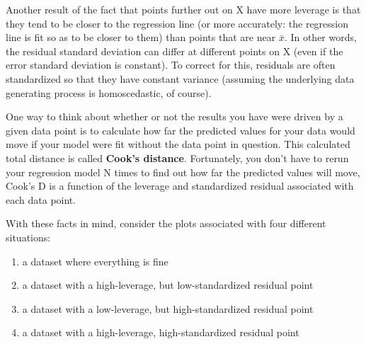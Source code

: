 \documentclass[12pt, a4paper]{article}
\theoremstyle{plain}
\theoremstyle{definition}
\theoremstyle{remark}
\begin{document}
Another result of the fact that points further out on X have more leverage is that they tend to be closer to the regression line (or more accurately: the regression line is fit so as to be closer to them) than points that are near $\bar{x}$. In other words, the residual standard deviation can differ at different points on X (even if the error standard deviation is constant). To correct for this, residuals are often standardized so that they have constant variance (assuming the underlying data generating process is homoscedastic, of course).

One way to think about whether or not the results you have were driven by a given data point is to calculate how far the predicted values for your data would move if your model were fit without the data point in question. This calculated total distance is called \textbf{Cook's distance}. Fortunately, you don't have to rerun your regression model N times to find out how far the predicted values will move, Cook's D is a function of the leverage and standardized residual associated with each data point.

With these facts in mind, consider the plots associated with four different situations:
\begin{enumerate}
\item a dataset where everything is fine
\item a dataset with a high-leverage, but low-standardized residual point
\item a dataset with a low-leverage, but high-standardized residual point
\item a dataset with a high-leverage, high-standardized residual point
\end{enumerate}
\newpage
\end{document}
